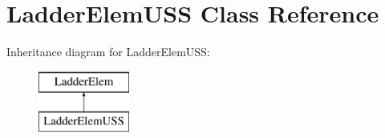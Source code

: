 \hypertarget{class_ladder_elem_u_s_s}{\section{Ladder\-Elem\-U\-S\-S Class Reference}
\label{class_ladder_elem_u_s_s}
}
Inheritance diagram for Ladder\-Elem\-U\-S\-S\-:\begin{figure}[H]
\begin{center}
\leavevmode
\includegraphics[height=2.000000cm]{class_ladder_elem_u_s_s}
\end{center}
\end{figure}

